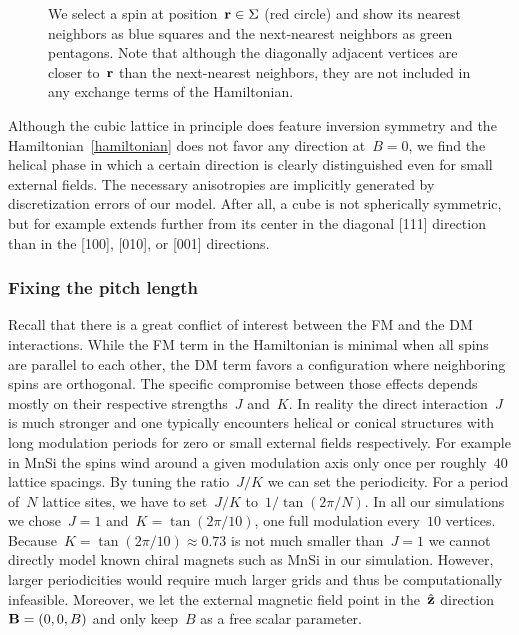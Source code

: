 \begin{figure}
  \centering
  \caption{We select a spin at position~$\mathbf{r} \in \Sigma$ (red circle) and show
  its nearest neighbors as blue squares and the next-nearest neighbors as green
  pentagons. Note that although the diagonally adjacent vertices are closer
  to~$\mathbf{r}$ than the next-nearest neighbors, they are not included in any
  exchange terms of the Hamiltonian.}
\label{fig:interact}
\end{figure}

Although the cubic lattice in principle does feature inversion symmetry and the
Hamiltonian~\eqref{hamiltonian} does not favor any direction at~$B=0$, we find
the helical phase in which a certain direction is clearly distinguished even for
small external fields. The necessary anisotropies are implicitly generated by
discretization errors of our model. After all, a cube is not spherically
symmetric, but for example extends further from its center in the diagonal [111]
direction than in the [100], [010], or [001] directions.

\subsubsection{Fixing the pitch length}

Recall that there is a great conflict of interest between the FM and the DM
interactions. While the FM term in the Hamiltonian is minimal when all spins are
parallel to each other, the DM term favors a configuration where neighboring
spins are orthogonal. The specific compromise between those effects depends
mostly on their respective strengths~$J$ and~$K$. In reality the direct
interaction~$J$ is much stronger and one typically encounters helical or conical
structures with long modulation periods for zero or small external fields
respectively. For example in MnSi the spins wind around a given modulation axis
only once per roughly~$40$ lattice spacings. By tuning the ratio~$J/K$ we can
set the periodicity. For a period of~$N$ lattice sites, we have to set~$J/K$
to~$1/\tan(2\pi / N)$. In all our simulations we chose~$J=1$ and~$K=\tan(2\pi /
10)$, \ie{} one full modulation every~$10$ vertices. Because~$K=\tan(2\pi /
10)\approx 0.73$ is not much smaller than~$J=1$ we cannot directly model known
chiral magnets such as MnSi in our simulation. However, larger periodicities
would require much larger grids and thus be computationally infeasible.
Moreover, we let the external magnetic field point in the~$\hat{\mathbf{z}}$
direction~$\mathbf{B}=(0,0,B)$ and only keep~$B$ as a free scalar parameter.

